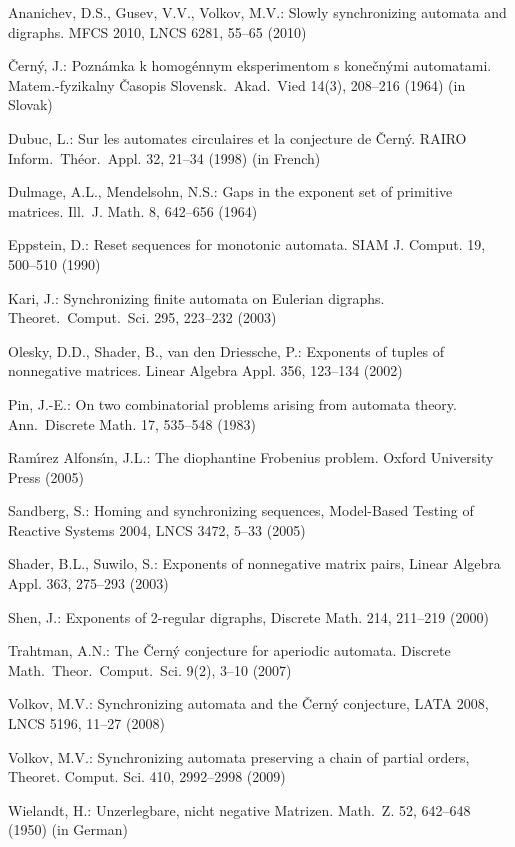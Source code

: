 \documentclass[11pt]{llncs}
\begin{document}
\begin{thebibliography}{99}

Ananichev, D.S., Gusev, V.V., Volkov, M.V.: Slowly synchronizing automata and
digraphs. MFCS 2010, LNCS 6281,  55--65 (2010)


\v{C}ern\'{y}, J.: Pozn\'{a}mka k homog\'{e}nnym eksperimentom s
kone\v{c}n\'{y}mi automatami. Matem.-fyzikalny \v{C}asopis Slovensk.\ Akad.\
Vied 14(3), 208--216 (1964) (in Slovak)

Dubuc, L.: Sur les automates circulaires et la conjecture de
\v{C}ern\'y. RAIRO Inform.\ Th\'eor.\ Appl. 32, 21--34 (1998) (in
French)

Dulmage, A.L., Mendelsohn, N.S.: Gaps in the exponent set of primitive
matrices. Ill.\ J. Math. 8, 642--656 (1964)

Eppstein, D.: Reset sequences for monotonic automata. SIAM J.
Comput. 19, 500--510 (1990)


Kari, J.: Synchronizing finite automata on Eulerian digraphs.
Theoret.\ Comput.\ Sci. 295, 223--232 (2003)

Olesky, D.D., Shader, B., van den Driessche, P.:
Exponents of tuples of nonnegative matrices. Linear Algebra Appl. 356,
123--134 (2002)

Pin, J.-E.: On two combinatorial problems arising from automata
theory. Ann.\ Discrete Math. 17, 535--548 (1983)

Ram\'{\i}rez Alfons\'{\i}n, J.L.: The diophantine Frobenius problem.
Oxford University Press (2005)

Sandberg, S.: Homing and synchronizing sequences,
Model-Based Testing of Reactive Systems 2004, LNCS 3472,
5--33 (2005)

Shader, B.L., Suwilo, S.: Exponents of nonnegative matrix
pairs, Linear Algebra Appl. 363, 275--293 (2003)


Shen, J.: Exponents of 2-regular digraphs, Discrete Math. 214,
211--219 (2000)

Trahtman, A.N.: The \v{C}ern\'y conjecture for aperiodic automata. Discrete
Math.\ Theor.\ Comput.\ Sci. 9(2), 3--10 (2007)

Volkov, M.V.: Synchronizing automata and the \v{C}ern\'{y}
conjecture, LATA 2008, LNCS 5196, 11--27 (2008)

Volkov, M.V.: Synchronizing automata preserving a chain of partial
orders, Theoret. Comput. Sci. 410, 2992--2998 (2009)

Wielandt, H.: Unzerlegbare, nicht negative Matrizen. Math.\ Z.
52, 642--648 (1950) (in German)
\end{thebibliography}
\end{document}
